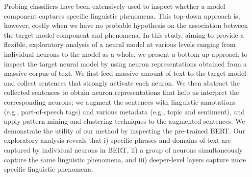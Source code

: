 Probing classifiers have been extensively used to inspect whether a model component captures specific linguistic phenomena. This top-down approach is, however, costly when we have no probable hypothesis on the association between the target model component and phenomena. In this study, aiming to provide a flexible, exploratory analysis of a neural model at various levels ranging from individual neurons to the model as a whole, we present a bottom-up approach to inspect the target neural model by using neuron representations obtained from a massive corpus of text. We first feed massive amount of text to the target model and collect sentences that strongly activate each neuron. We then abstract the collected sentences to obtain neuron representations that help us interpret the corresponding neurons; we augment the sentences with linguistic annotations (e.g., part-of-speech tags) and various metadata (e.g., topic and sentiment), and apply pattern mining and clustering techniques to the augmented sentences.  We demonstrate the utility of our method by inspecting the pre-trained BERT. Our exploratory analysis reveals that i) specific phrases and domains of text are captured by individual neurons in BERT, ii) a group of neurons simultaneously capture the same linguistic phenomena, and iii) deeper-level layers capture more specific linguistic phenomena.
